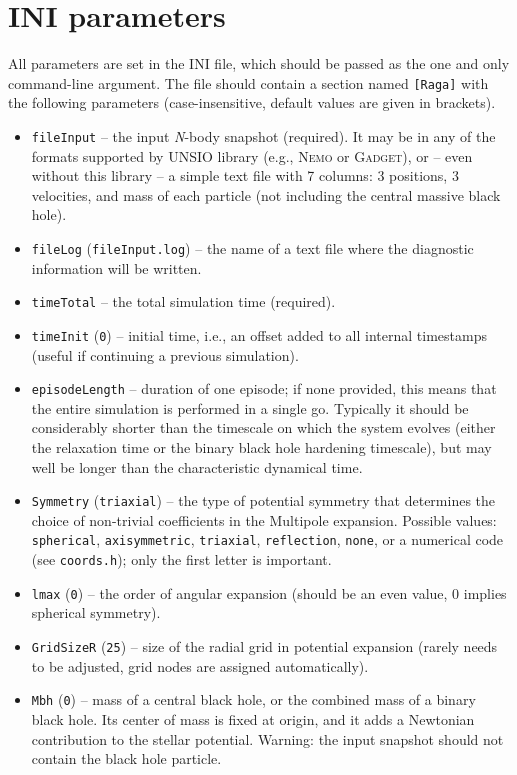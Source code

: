 \documentclass[12pt]{article}
\newcommand{\Nbody}{\textsl{N}-body\xspace}
\newcommand{\Nemo}{\textsc{Nemo}\xspace}
\begin{document}
\section{INI parameters}

All parameters are set in the INI file, which should be passed as the one and only command-line argument. The file should contain a section named \texttt{[Raga]} with the following parameters (case-insensitive, default values are given in brackets).
\begin{itemize}
\item \texttt{fileInput}  -- the input \Nbody snapshot (required).
It may be in any of the formats supported by UNSIO library (e.g., \Nemo or \textsc{Gadget}), or -- even without this library -- a simple text file with 7 columns: 3 positions, 3 velocities, and mass of each particle (not including the central massive black hole).
\item \texttt{fileLog}  (\texttt{fileInput.log}) -- the name of a text file where the diagnostic information will be written.
\item \texttt{timeTotal}  -- the total simulation time (required).
\item \texttt{timeInit}  (\texttt{0}) -- initial time, i.e., an offset added to all internal timestamps (useful if continuing a previous simulation).
\item \texttt{episodeLength}  -- duration of one episode; if none provided, this means that the entire simulation is performed in a single go. Typically it should be considerably shorter than the timescale on which the system evolves (either the relaxation time or the binary black hole hardening timescale), but may well be longer than the characteristic dynamical time.
\item \texttt{Symmetry}  (\texttt{triaxial}) -- the type of potential symmetry that determines the choice of non-trivial coefficients in the Multipole expansion. Possible values: \texttt{spherical}, \texttt{axisymmetric}, \texttt{triaxial}, \texttt{reflection}, \texttt{none}, or a numerical code (see \texttt{coords.h}); only the first letter is important.
\item \texttt{lmax}  (\texttt{0}) -- the order of angular expansion (should be an even value, 0 implies spherical symmetry).
\item \texttt{GridSizeR}  (\texttt{25}) -- size of the radial grid in potential expansion (rarely needs to be adjusted, grid nodes are assigned automatically).
\item \texttt{Mbh} (\texttt{0}) -- mass of a central black hole, or the combined mass of a binary black hole. Its center of mass is fixed at origin, and it adds a Newtonian contribution to the stellar potential. Warning: the input snapshot should not contain the black hole particle.

\end{itemize}
\end{document}
